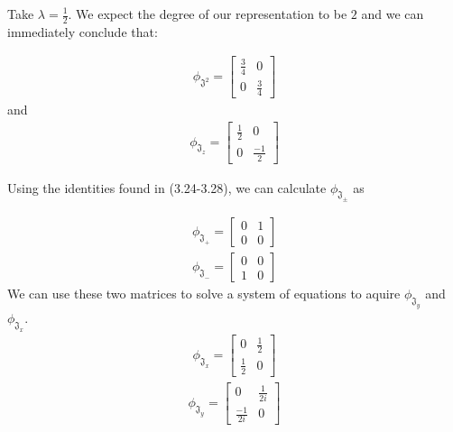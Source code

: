 \begin{example}\end{example}
	Take $\lambda= \frac{1}{2}$. We expect the degree of our representation to be $2$ and we can immediately conclude that:

\begin{equation}
\begin{aligned}
	\phi_{\mathfrak{J^2}} = \begin{bmatrix}
									\frac{3}{4} & 0 \\
									0 & \frac{3}{4}
								\end{bmatrix}
\end{aligned}
\end{equation}
and 
\begin{equation}
\begin{aligned}
	\phi_{\mathfrak{J}_z} = \begin{bmatrix}
									\frac{1}{2} & 0 \\
									0 & \frac{-1}{2}
								\end{bmatrix}
\end{aligned}
\end{equation}

Using the identities found in (3.24-3.28), we can calculate $\phi_{\mathfrak{J}_\pm}$ as 

\begin{equation}
\begin{aligned}
	\phi_{\mathfrak{J}_+} = \begin{bmatrix}
									0 & 1 \\
									0 & 0
								\end{bmatrix}
\end{aligned}
\end{equation}
\begin{equation}
\begin{aligned}
	\phi_{\mathfrak{J}_-} = \begin{bmatrix}
									0 & 0 \\
									1 & 0
								\end{bmatrix}
\end{aligned}
\end{equation}
We can use these two matrices to solve a system of equations to aquire $\phi_{\mathfrak{J}_y}$ and $\phi_{\mathfrak{J}_x}$.
\begin{equation}
\begin{aligned}
	\phi_{\mathfrak{J}_x} = \begin{bmatrix}
									0 & \frac{1}{2} \\
									\frac{1}{2} & 0
								\end{bmatrix}
\end{aligned}
\end{equation}
\begin{equation}
\begin{aligned}
	\phi_{\mathfrak{J}_y} = \begin{bmatrix}
									0 & \frac{1}{2i} \\
									\frac{-1}{2i} & 0
								\end{bmatrix}
\end{aligned}
\end{equation}

